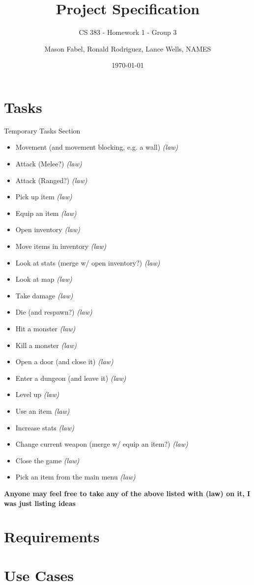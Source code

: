\documentclass[12pt]{report}
\title{Project Specification}
\subtitle{CS 383 - Homework 1 - Group 3}
\author{Mason Fabel, Ronald Rodriguez, Lance Wells, NAMES} %
\date{\today}
\begin{document}
\maketitle


\chapter{Tasks}

\begin{section}{Temporary Tasks Section}

\begin{itemize}
\item	Movement (and movement blocking, e.g. a wall) \textit{(law)}
\item	Attack (Melee?) \textit{(law)}
\item	Attack (Ranged?) \textit{(law)}
\item	Pick up item \textit{(law)}
\item	Equip an item \textit{(law)}
\item	Open inventory \textit{(law)}
\item	Move items in inventory \textit{(law)}
\item	Look at stats (merge w/ open inventory?) \textit{(law)}
\item	Look at map \textit{(law)}
\item	Take damage \textit{(law)}
\item	Die (and respawn?) \textit{(law)}
\item	Hit a monster \textit{(law)}
\item	Kill a monster \textit{(law)}
\item	Open a door (and close it) \textit{(law)}
\item	Enter a dungeon (and leave it) \textit{(law)}
\item	Level up \textit{(law)}
\item	Use an item \textit{(law)}
\item	Increase stats \textit{(law)}
\item	Change current weapon (merge w/ equip an item?) \textit{(law)}
\item	Close the game \textit{(law)}
\item	Pick an item from the main menu \textit{(law)}
\end{itemize}

\large \textbf{Anyone may feel free to take any of the above listed with (law) on it, 
I was just listing ideas}

\end{section}

\chapter{Requirements}

\chapter{Use Cases}
\end{document}

